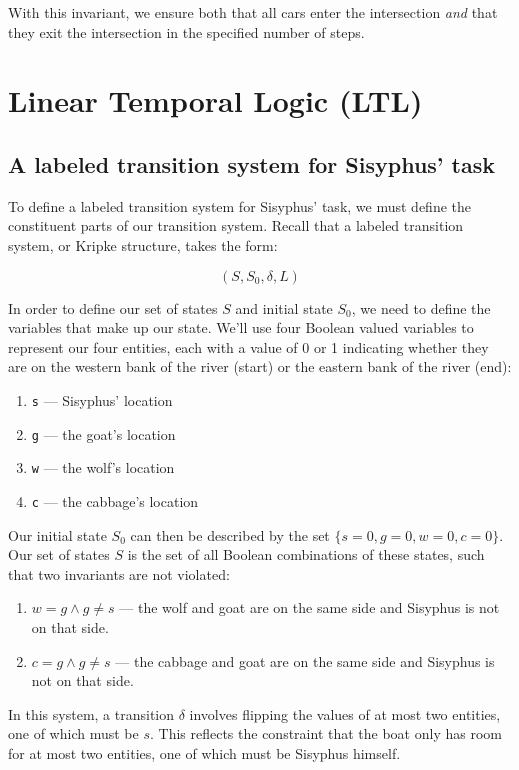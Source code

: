 \documentclass{article}
\newcommand{\code}[1]{\texttt{#1}}
\begin{document}
With this invariant, we ensure both that all cars enter the intersection \emph{and} that they exit the intersection in the specified number of steps.

\section{Linear Temporal Logic (LTL)}

\subsection{A labeled transition system for Sisyphus' task}

To define a labeled transition system for Sisyphus' task, we must define the constituent parts of our transition system. Recall that a labeled transition system, or Kripke structure, takes the form:

$$
(S, S_0, \delta, L)
$$

In order to define our set of states $S$ and initial state $S_0$, we need to define the variables that make up our state. We'll use four Boolean valued variables to represent our four entities, each with a value of 0 or 1 indicating whether they are on the western bank of the river (start) or the eastern bank of the river (end):

\begin{enumerate}
  \item \code{s} — Sisyphus' location 
  \item \code{g} — the goat's location
  \item \code{w} — the wolf's location
  \item \code{c} — the cabbage's location
\end{enumerate}

Our initial state $S_0$ can then be described by the set $\{s = 0, g = 0, w = 0, c = 0\}$. Our set of states $S$ is the set of all Boolean combinations of these states, such that two invariants are not violated: 

\begin{enumerate}
  \item $w = g \land g \neq s$ — the wolf and goat are on the same side and Sisyphus is not on that side.
  \item $c = g \land g \neq s$ — the cabbage and goat are on the same side and Sisyphus is not on that side.
\end{enumerate}

In this system, a transition $\delta$ involves flipping the values of at most two entities, one of which must be $s$. This reflects the constraint that the boat only has room for at most two entities, one of which must be Sisyphus himself.
\end{document}
